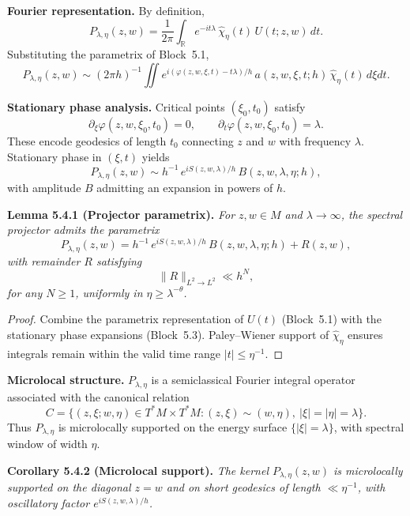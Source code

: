 \medskip

\noindent\textbf{Fourier representation.}
By definition,
\[
   P_{\lambda,\eta}(z,w) = \frac{1}{2\pi} \int_{\mathbb{R}}
   e^{-it\lambda}\, \widehat{\chi}_\eta(t)\, U(t;z,w)\, dt.
\]
Substituting the parametrix of Block~5.1,
\[
   P_{\lambda,\eta}(z,w) \sim (2\pi h)^{-1} \iint
   e^{i(\varphi(z,w,\xi,t)-t\lambda)/h}\,
   a(z,w,\xi,t;h)\, \widehat{\chi}_\eta(t)\, d\xi dt.
\]

\medskip

\noindent\textbf{Stationary phase analysis.}
Critical points $(\xi_0,t_0)$ satisfy
\[
   \partial_\xi \varphi(z,w,\xi_0,t_0) = 0,
   \qquad
   \partial_t \varphi(z,w,\xi_0,t_0) = \lambda.
\]
These encode geodesics of length $t_0$ connecting $z$ and $w$
with frequency $\lambda$.
Stationary phase in $(\xi,t)$ yields
\[
   P_{\lambda,\eta}(z,w) \sim h^{-1}\,
   e^{i S(z,w,\lambda)/h}\,
   B(z,w,\lambda,\eta;h),
\]
with amplitude $B$ admitting an expansion in powers of $h$.

\medskip

\noindent\textbf{Lemma 5.4.1 (Projector parametrix).}
\emph{For $z,w\in M$ and $\lambda\to\infty$,
the spectral projector admits the parametrix}
\[
   P_{\lambda,\eta}(z,w) = h^{-1}\,
   e^{i S(z,w,\lambda)/h}\,
   B(z,w,\lambda,\eta;h) + R(z,w),
\]
\emph{with remainder $R$ satisfying}
\[
   \|R\|_{L^2\to L^2} \ll h^N,
\]
\emph{for any $N\ge 1$, uniformly in $\eta\ge \lambda^{-\theta}$.}

\begin{proof}
Combine the parametrix representation of $U(t)$ (Block~5.1)
with the stationary phase expansions (Block~5.3).
Paley–Wiener support of $\widehat{\chi}_\eta$ ensures integrals remain
within the valid time range $|t|\le \eta^{-1}$.
\end{proof}

\medskip

\noindent\textbf{Microlocal structure.}
$P_{\lambda,\eta}$ is a semiclassical Fourier integral operator
associated with the canonical relation
\[
   C = \{ (z,\xi; w,\eta)\in T^*M\times T^*M :
   (z,\xi)\sim (w,\eta),\ |\xi|=|\eta|=\lambda \}.
\]
Thus $P_{\lambda,\eta}$ is microlocally supported on the energy surface
$\{|\xi|=\lambda\}$, with spectral window of width $\eta$.

\medskip

\noindent\textbf{Corollary 5.4.2 (Microlocal support).}
\emph{The kernel $P_{\lambda,\eta}(z,w)$ is microlocally supported
on the diagonal $z=w$ and on short geodesics of length $\ll \eta^{-1}$,
with oscillatory factor $e^{iS(z,w,\lambda)/h}$.}

